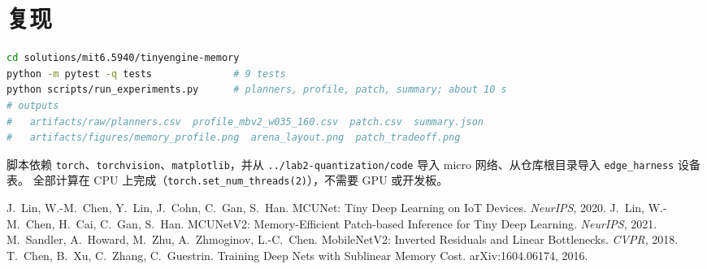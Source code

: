 \documentclass[11pt,a4paper]{ctexart}
\begin{document}
\section{复现}

\begin{lstlisting}[language=bash,numbers=none]
cd solutions/mit6.5940/tinyengine-memory
python -m pytest -q tests              # 9 tests
python scripts/run_experiments.py      # planners, profile, patch, summary; about 10 s
# outputs
#   artifacts/raw/planners.csv  profile_mbv2_w035_160.csv  patch.csv  summary.json
#   artifacts/figures/memory_profile.png  arena_layout.png  patch_tradeoff.png
\end{lstlisting}

脚本依赖 \texttt{torch}、\texttt{torchvision}、\texttt{matplotlib}，并从 \texttt{../lab2-quantization/code} 导入 micro 网络、从仓库根目录导入 \texttt{edge\_harness} 设备表。
全部计算在 CPU 上完成（\texttt{torch.set\_num\_threads(2)}），不需要 GPU 或开发板。

\begin{thebibliography}{99}
 J.~Lin, W.-M.~Chen, Y.~Lin, J.~Cohn, C.~Gan, S.~Han. MCUNet: Tiny Deep Learning on IoT Devices. \emph{NeurIPS}, 2020.
 J.~Lin, W.-M.~Chen, H.~Cai, C.~Gan, S.~Han. MCUNetV2: Memory-Efficient Patch-based Inference for Tiny Deep Learning. \emph{NeurIPS}, 2021.
 M.~Sandler, A.~Howard, M.~Zhu, A.~Zhmoginov, L.-C.~Chen. MobileNetV2: Inverted Residuals and Linear Bottlenecks. \emph{CVPR}, 2018.
 T.~Chen, B.~Xu, C.~Zhang, C.~Guestrin. Training Deep Nets with Sublinear Memory Cost. arXiv:1604.06174, 2016.
\end{thebibliography}
\end{document}
